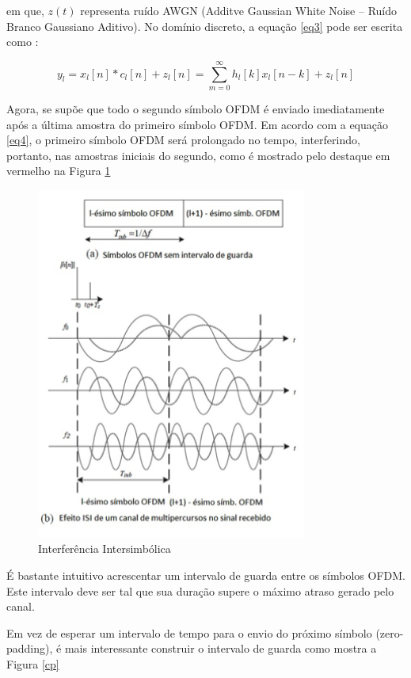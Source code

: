 em que, $z(t)$ representa ruído AWGN (Additve Gaussian White Noise – Ruído Branco Gaussiano Aditivo). No domínio discreto, a equação \ref{eq3} pode ser escrita como \cite{tcc9}:

\begin{equation} \label{eq4}
y_{l} = x_{l}[n] \ast c_{l}[n] + z_{l}[n] = \sum_{m=0}^{\infty}h_{l}[k]x_{l}[n-k]+z_{l}[n]
\end{equation}
	
\par Agora, se supõe que todo o segundo símbolo OFDM é enviado imediatamente após a última amostra do primeiro símbolo OFDM. Em acordo com a equação \ref{eq4}, o primeiro símbolo OFDM será prolongado no tempo, interferindo, portanto, nas amostras iniciais do segundo, como é mostrado pelo destaque em vermelho na Figura \ref{multichan}
	
\begin{figure}[h!]
\centering
\includegraphics[width=3.5in]{ISIOFDM.png} %
\caption{Interferência Intersimbólica \cite{tcc9}}
\label{multichan}
\end{figure}

\par É bastante intuitivo acrescentar um intervalo de guarda entre os símbolos OFDM. Este intervalo deve ser tal que sua duração supere o máximo atraso gerado pelo canal.  
\par Em vez de esperar um intervalo de tempo para o envio do próximo símbolo (zero-padding), é mais interessante construir o intervalo de guarda como mostra a Figura \ref{cp}


